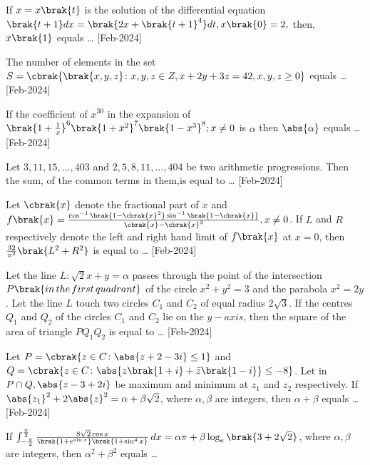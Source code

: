 \iffalse
\title{2024}
\author{EE24BTECH11021}
\section{integer}
\fi
    \item If $x=x\brak{t}$ is the solution of the differential equation\\
    $\brak{t+1}dx=\brak{2x+\brak{t+1}^4}dt,x\brak{0}=2,$ then, $x\brak{1}$ equals \dots
    \hfill{[Feb-2024]}
    \item The number of elements in the set\\
            $S=\cbrak{\brak{x,y,z}\colon x,y,z\in Z,x+2y+3z=42,x,y,z\geq0}$ equals \dots
            \hfill{[Feb-2024]}
    \item If the coefficient of $x^{30}$ in the expansion of $\brak{1+\frac{1}{x}}^6\brak{1+x^2}^7\brak{1-x^3}^8;x\neq0$ is $\alpha$ then $\abs{\alpha}$ equals \dots
    \hfill{[Feb-2024]}
    \item Let $3,11,15,\dots,403$ and $2,5,8,11,\dots,404$ be two arithmetic progressions. Then the sum, of the common terms in them,is equal to \dots
    \hfill{[Feb-2024]}
    \item Let $\cbrak{x}$ denote the fractional part of $x$ and $f\brak{x}=\frac{\cos^{-1}\brak{1-\cbrak{x}^2}\sin^{-1}\brak{1-\cbrak{x}}}{\cbrak{x}-\cbrak{x}^3},x\neq0$. If $L$ and $R$ respectively denote the left and right hand limit of $f\brak{x}$ at $x=0$, then $\frac{32}{\pi^2}\brak{L^2+R^2}$ is equal to \dots
    \hfill{[Feb-2024]}
    \item Let the line $L\colon\sqrt{2}x+y=\alpha$ passes through the point of the intersection $P\brak{in\,the\,first\,quadrant}$ of the circle $x^2+y^2=3$ and the parabola $x^2=2y$. Let the line $L$ touch two circles $C_1$ and $C_2$ of equal radius $2\sqrt{3}$. If the centres $Q_1$ and $Q_2$ of the circles $C_1$ and $C_2$ lie on the $y-axis$, then the square of the area of triangle $PQ_1Q_2$ is equal to \dots 
    \hfill{[Feb-2024]}
    \item Let $P=\cbrak{z\in C\colon\abs{z+2-3i}\leq 1}$ and $Q=\cbrak{z\in C\colon\abs{z\brak{1+i}+\Bar{z}\brak{1-i}}\leq -8}$. Let in $P\cap Q,\abs{z-3+2i}$ be maximum and minimum at $z_1$ and $z_2$ respectively. If $\abs{z_1}^2+2\abs{z}^2=\alpha+\beta\sqrt{2}$, where $\alpha,\beta$ are integers, then $\alpha+\beta$ equals \dots
    \hfill{[Feb-2024]}
    \item If $\int_{-\frac{\pi}{2}}^{\frac{\pi}{2}}\frac{8\sqrt{2}\cos{x}}{\brak{1+e^{\sin{x}}}\brak{1+\sin^4{x}}} \, dx=\alpha\pi+\beta\log_{e}\brak{3+2\sqrt{2}}$, where $\alpha,\beta$ are integers, then $\alpha^2+\beta^2$ equals \dots
